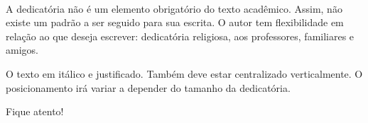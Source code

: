 \newpage
    \begin{dedicatoria}
       \vspace*{\fill}
       \centering
       \hspace{.9\textwidth}
            \begin{minipage}{.6\textwidth}
            \setlength{\parskip}{0.5cm}	
            \fonteDedicatoria 
            \begin{itshape}
             \\
            A dedicatória não é um elemento obrigatório do texto acadêmico. Assim, não existe um padrão a ser seguido para sua escrita. O autor tem flexibilidade em relação ao que deseja escrever: dedicatória religiosa, aos professores, familiares e amigos.

            O texto em itálico e justificado. Também deve estar centralizado verticalmente. O posicionamento irá variar a depender do tamanho da dedicatória.

            Fique atento!
            \end{itshape}
            \end{minipage}
       
        \vspace*{\fill}
    \end{dedicatoria}